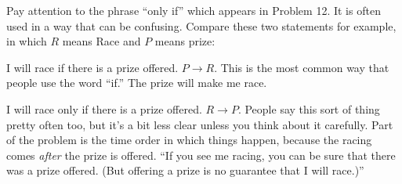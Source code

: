 Pay attention to the phrase ``only if'' which appears in Problem 12. 
It is often used in a way that can be confusing.  
Compare these two statements for example, in which $R$ means Race and $P$ means prize:
\blist{0.0in}
\item I will race if there is a prize offered.  $P \to R$.  This is the most common way that people use the word ``if.''  The prize will make me race.
\item I will race only if there is a prize offered.  $R \to P$.  People say this sort of thing pretty often too, but it's a bit less clear unless you think about it carefully.  Part of the problem is the time order in which things happen, because the racing comes {\em after} the prize is offered.  ``If you see me racing, you can be sure that there was a prize offered. (But offering a prize is no guarantee that I will race.)''
\elist



\vfill          %
